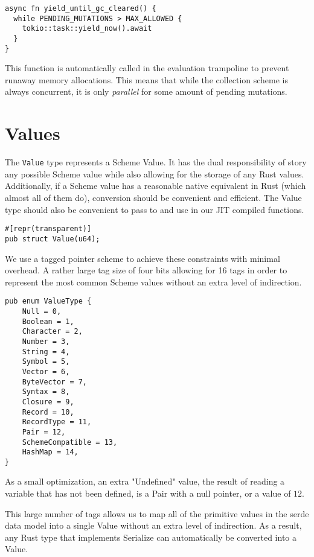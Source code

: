 \documentclass[sigplan,authordraft]{acmart}
\begin{document}
\begin{verbatim}
async fn yield_until_gc_cleared() {
  while PENDING_MUTATIONS > MAX_ALLOWED {
    tokio::task::yield_now().await
  }
}
\end{verbatim}

This function is automatically called in the evaluation trampoline to prevent
runaway memory allocations. This means that while the collection scheme is
always concurrent, it is only \textit{parallel} for some amount of pending
mutations.

\section{Values}

The \texttt{Value} type represents a Scheme Value. It has the dual responsibility
of story any possible Scheme value while also allowing for the storage of any
Rust values. Additionally, if a Scheme value has a reasonable native equivalent
in Rust (which almost all of them do), conversion should be convenient and
efficient. The Value type should also be convenient to pass to and use in our
JIT compiled functions.

\begin{verbatim}
#[repr(transparent)]
pub struct Value(u64);
\end{verbatim}

We use a tagged pointer\cite{tags} scheme to achieve these constraints with
minimal overhead. A rather large tag size of four bits allowing for 16 tags in
order to represent the most common Scheme values without an extra level of
indirection.

\begin{verbatim}
pub enum ValueType {
    Null = 0,
    Boolean = 1,
    Character = 2,
    Number = 3,
    String = 4,
    Symbol = 5,
    Vector = 6,
    ByteVector = 7,
    Syntax = 8,
    Closure = 9,
    Record = 10,
    RecordType = 11,
    Pair = 12,
    SchemeCompatible = 13,
    HashMap = 14,
}
\end{verbatim}

As a small optimization, an extra "Undefined" value, the result of reading a
variable that has not been defined, is a Pair with a null pointer, or a value
of $12$.

This large number of tags allows us to map all of the primitive values in the
serde data model\cite{serde} into a single Value without an extra level of
indirection. As a result, any Rust type that implements Serialize can
automatically be converted into a Value.
\end{document}
